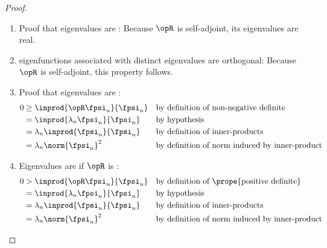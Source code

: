 \begin{proof}
\begin{enumerate}
\item Proof that eigenvalues are :
Because $\opR$ is self-adjoint, its eigenvalues are real.

\item eigenfunctions associated with distinct eigenvalues are orthogonal:
Because $\opR$ is self-adjoint, this property follows.

\item Proof that eigenvalues are :
\begin{align*}
   0 &\ge \inprod{\opR \fpsi_n}{\fpsi_n}
     &&   \text{by definition of non-negative definite}
   \\&=   \inprod{\lambda_n \fpsi_n}{\fpsi_n}
     &&   \text{by hypothesis}
   \\&=   \lambda_n \inprod{\fpsi_n}{\fpsi_n}
     &&   \text{by definition of inner-products}
   \\&=   \lambda_n \norm{\fpsi_n}^2
     &&   \text{by definition of norm induced by inner-product}
\end{align*}

\item Eigenvalues are  if $\opR$ is :
\begin{align*}
   0 &> \inprod{\opR \fpsi_n}{\fpsi_n}
     && \text{by definition of \prope{positive definite}}
   \\&= \inprod{\lambda_n \fpsi_n}{\fpsi_n}
     && \text{by hypothesis}
   \\&= \lambda_n \inprod{\fpsi_n}{\fpsi_n}
     && \text{by definition of inner-products}
   \\&= \lambda_n \norm{\fpsi_n}^2
     && \text{by definition of norm induced by inner-product}
\end{align*}

\end{enumerate}
\end{proof}

